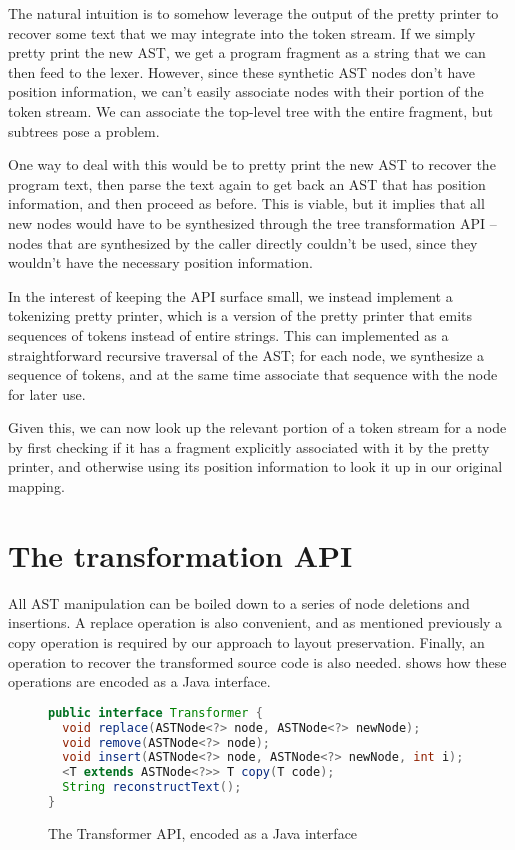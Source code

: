 The natural intuition is to somehow leverage the output of the pretty printer
to recover some text that we may integrate into the token stream. If we simply
pretty print the new AST, we get a program fragment as a string that we can
then feed to the lexer. However, since these synthetic AST nodes don't have
position information, we can't easily associate nodes with their portion of the
token stream. We can associate the top-level tree with the entire fragment, but
subtrees pose a problem.

One way to deal with this would be to pretty print the new AST to recover the
program text, then parse the text again to get back an AST that has position
information, and then proceed as before. This is viable, but it implies that
all new nodes would have to be synthesized through the tree transformation API
-- nodes that are synthesized by the caller directly couldn't be used, since
they wouldn't have the necessary position information.

In the interest of keeping the API surface small, we instead implement a
tokenizing pretty printer, which is a version of the pretty printer that emits
sequences of tokens instead of entire strings. This can implemented as a
straightforward recursive traversal of the AST; for each node, we synthesize a
sequence of tokens, and at the same time associate that sequence with the node
for later use.

Given this, we can now look up the relevant portion of a token stream for a node
by first checking if it has a fragment explicitly associated with it by the
pretty printer, and otherwise using its position information to look it up in
our original mapping.

\section{The transformation API}
All AST manipulation can be boiled down to a series of node deletions and insertions.
A replace operation is also convenient, and as mentioned previously a copy operation
is required by our approach to layout preservation. Finally, an operation to recover
the transformed source code is also needed.  shows how
these operations are encoded as a Java interface.

\begin{figure}
\begin{lstlisting}[numbers=none, language=Java]
public interface Transformer {
  void replace(ASTNode<?> node, ASTNode<?> newNode);
  void remove(ASTNode<?> node);
  void insert(ASTNode<?> node, ASTNode<?> newNode, int i);
  <T extends ASTNode<?>> T copy(T code);
  String reconstructText();
}
\end{lstlisting}
\caption{The Transformer API, encoded as a Java interface}
\label{Fig:TransformerAPI}
\end{figure}


